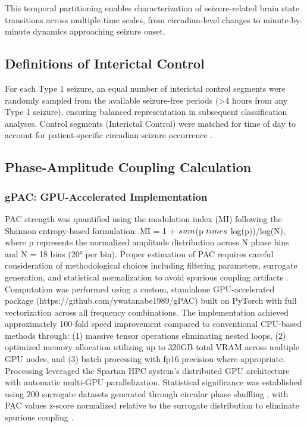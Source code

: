 This temporal partitioning enables characterization of seizure-related brain state transitions across multiple time scales, from circadian-level changes to minute-by-minute dynamics approaching seizure onset.

\subsection{Definitions of Interictal Control}

For each Type 1 seizure, an equal number of interictal control segments were randomly sampled from the available seizure-free periods (>4 hours from any Type 1 seizure), ensuring balanced representation in subsequent classification analyses. Control segments (Interictal Control) were matched for time of day to account for patient-specific circadian seizure occurrence \cite{Kuhlmann2018SeizurePA}.


\subsection{Phase-Amplitude Coupling Calculation}
\subsubsection{gPAC: GPU-Accelerated Implementation}
PAC strength was quantified using the modulation index (MI) \cite{Tort2010MeasuringPCE,Dvok2014TowardAPJ} following the Shannon entropy-based formulation: MI = 1 + $\\sum$(p $\\times$ log(p))/log(N), where p represents the normalized amplitude distribution across N phase bins and N = 18 bins (20° per bin). Proper estimation of PAC requires careful consideration of methodological choices including filtering parameters, surrogate generation, and statistical normalization to avoid spurious coupling artifacts \cite{Dvok2014TowardAPJ,Seymour2017TheDOX}. Computation was performed using a custom, standalone GPU-accelerated package (https://github.com/ywatanabe1989/gPAC) built on PyTorch with full vectorization across all frequency combinations. The implementation achieved approximately 100-fold speed improvement compared to conventional CPU-based methods \cite{Combrisson2020TensorpacAOAH} through: (1) massive tensor operations eliminating nested loops, (2) optimized memory allocation utilizing up to 320GB total VRAM across multiple GPU nodes, and (3) batch processing with fp16 precision where appropriate. Processing leveraged the Spartan HPC system's distributed GPU architecture with automatic multi-GPU parallelization. Statistical significance was established using 200 surrogate datasets generated through circular phase shuffling \cite{Tort2010MeasuringPCE,Aru2014UntanglingCCD}, with PAC values z-score normalized relative to the surrogate distribution to eliminate spurious coupling \cite{Jensen2016DiscriminatingVFR}.

